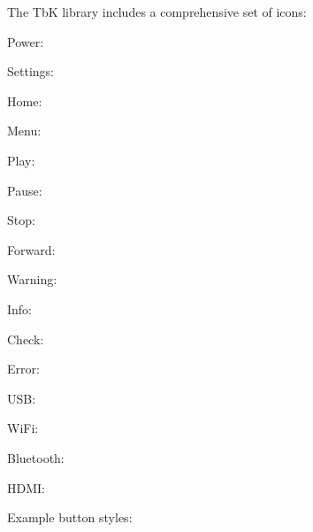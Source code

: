 \documentclass[11pt,a4paper]{article}
\begin{document}


The TbK library includes a comprehensive set of icons:


\begin{tbkList}
  \item Power: 
  \item Settings: 
  \item Home: 
  \item Menu: 
\end{tbkList}


\begin{tbkList}
  \item Play: 
  \item Pause: 
  \item Stop: 
  \item Forward: 
\end{tbkList}


\begin{tbkList}
  \item Warning: 
  \item Info: 
  \item Check: 
  \item Error: 
\end{tbkList}


\begin{tbkList}
  \item USB: 
  \item WiFi: 
  \item Bluetooth: 
  \item HDMI: 
\end{tbkList}


Example button styles:

\begin{center}
  \quad
  \quad
  \quad
\end{center}
\end{document}
